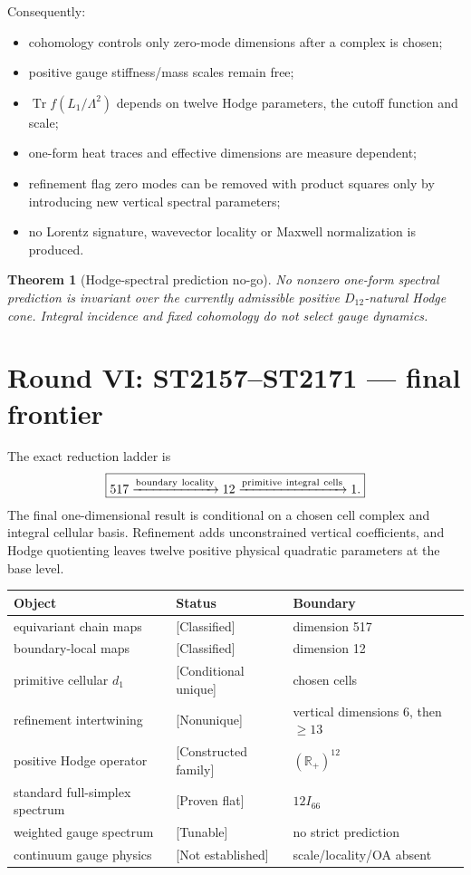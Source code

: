 \documentclass[11pt,a4paper]{article}
\newtheorem{theorem}{Theorem}\newcommand{\status}[1]{\textsf{[#1]}}
\begin{document}
Consequently:
\begin{itemize}
\item cohomology controls only zero-mode dimensions after a complex is chosen;
\item positive gauge stiffness/mass scales remain free;
\item $\operatorname{Tr}f(L_1/\Lambda^2)$ depends on twelve Hodge parameters,
      the cutoff function and scale;
\item one-form heat traces and effective dimensions are measure dependent;
\item refinement flag zero modes can be removed with product squares only by
      introducing new vertical spectral parameters;
\item no Lorentz signature, wavevector locality or Maxwell normalization is
      produced.
\end{itemize}

\begin{theorem}[Hodge-spectral prediction no-go]
No nonzero one-form spectral prediction is invariant over the currently
admissible positive $D_{12}$-natural Hodge cone.  Integral incidence and fixed
cohomology do not select gauge dynamics.
\end{theorem}

\section{Round VI: ST2157--ST2171 --- final frontier}

The exact reduction ladder is
\[
\boxed{517\xrightarrow{\rm boundary\ locality}12
\xrightarrow{\rm primitive\ integral\ cells}1.}
\]
The final one-dimensional result is conditional on a chosen cell complex and
integral cellular basis.  Refinement adds unconstrained vertical coefficients,
and Hodge quotienting leaves twelve positive physical quadratic parameters at
the base level.

\begin{longtable}{@{}p{}p{}p{}@{}}
\toprule
Object & Status & Boundary \\
\midrule\endhead
equivariant chain maps & \status{Classified} & dimension 517 \\
boundary-local maps & \status{Classified} & dimension 12 \\
primitive cellular $d_1$ & \status{Conditional unique} & chosen cells \\
refinement intertwining & \status{Nonunique} & vertical dimensions 6, then $\ge13$ \\
positive Hodge operator & \status{Constructed family} & $(\mathbb R_+)^{12}$ \\
standard full-simplex spectrum & \status{Proven flat} & $12I_{66}$ \\
weighted gauge spectrum & \status{Tunable} & no strict prediction \\
continuum gauge physics & \status{Not established} & scale/locality/OA absent \\
\bottomrule
\end{longtable}
\end{document}
